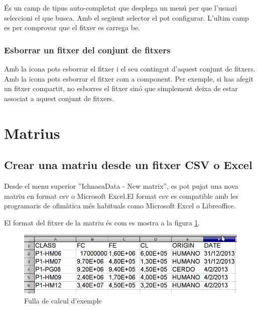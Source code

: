 \'{E}s un camp de tipus auto-completat que desplega un menú per que l'usuari seleccioni el que busca. Amb el següent selector el pot configurar. L'ultim camp es per comprovar que el fitxer es carrega be.

\subsubsection{Esborrar un fitxer del conjunt de fitxers}
Amb la icona \icontrash pots esborrar el fitxer i el seu contingut d'aquest conjunt de fitxers.\\
Amb la icona \iconremove pots esborrar el fitxer com a component. Per exemple, si has afegit un fitxer compartit, no esborres el fitxer sinó que simplement deixa de estar associat a aquest conjunt de fitxers.

\section{Matrius}

\subsection{Crear una matriu desde un fitxer CSV o Excel}
\label{sec:create_matrix}
Desde el menu superior ''IchnaeaData - New matrix'', es pot pujat una nova matriu en format csv o Microsoft Excel.El format csv es compatible amb les programaris de ofim\`{a}tica m\'{e}s habituals como Microsoft Excel o Libreoffice.

El format del fitxer de la matriu \'{e}s com es mostra a la figura \ref{fig:matrixSource}.
\begin{figure}[h!]
  \centering
  \includegraphics[scale=0.5]{img/userguide/matrix_source.png}
  \caption{Fulla de calcul d'exemple}
  \label{fig:matrixSource}
\end{figure}

